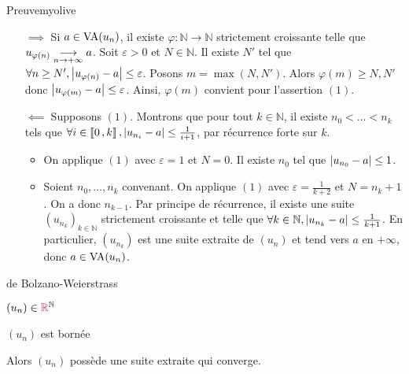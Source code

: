     \begin{demo}{Preuve}{myolive}
        \begin{itemize}
            \item[\textcolor{myolive}{$\implies$}] Si $a \in \operatorname{VA}(u_n)$, il existe $\varphi : \mathbb{N} \rightarrow \mathbb{N}$ strictement croissante telle que $u_{\varphi(n)} \underset{n \rightarrow +\infty}{\longrightarrow} a$. Soit $\varepsilon > 0$ et $N \in \mathbb{N}$. Il existe $N'$ tel que $\forall n \geq N', \left\lvert u_{\varphi(n)} - a\right\rvert \leq \varepsilon$. Posons $m = \max(N,N')$. Alors $\varphi(m) \geq N, N'$ donc $\left\lvert u_{\varphi(m)}-a\right\rvert \leq \varepsilon$. Ainsi, $\varphi(m)$ convient pour l’assertion $(1)$.
            \item[\textcolor{myolive}{$\impliedby$}] Supposons $(1)$. Montrons que pour tout $k \in \mathbb{N}$, il existe $n_0 < \ldots < n_k$ tels que $\forall i \in \left\llbracket 0 \, , k \right\rrbracket, \left\lvert u_{n_i} - a\right\rvert \leq \frac{1}{i + 1}$, par récurrence forte sur $k$.
            \begin{itemize}
                \item On applique $(1)$ avec $\varepsilon = 1$ et $N = 0$. Il existe $n_0$ tel que $\left\lvert u_{n_0} - a\right\rvert \leq 1$.
                \item Soient $n_0, \ldots, n_k$ convenant. On applique $(1)$ avec $\varepsilon = \frac{1}{k+2}$ et $N = n_k + 1$. On a donc $n_{k-1}$. Par principe de récurrence, il existe une suite $(u_{n_k})_{k \in \mathbb{N}}$ strictement croissante et telle que $\forall k \in \mathbb{N}, \left\lvert u_{n_k} - a\right\rvert \leq \frac{1}{k+1}$. En particulier, $(u_{n_k})$ est une suite extraite de $(u_n)$ et tend vers $a$ en $+\infty$, donc $a \in \operatorname{VA}(u_n)$.
            \end{itemize}
        \end{itemize}
    \end{demo}

    \begin{theo}{de Bolzano-Weierstrass}{}
        \begin{soient}
            \item $(u_n) \in \textcolor{myred}{\mathbb{R}}^{\mathbb{N}}$
            \item $(u_n)$ est bornée
        \end{soient}
        Alors $(u_n)$ possède une suite extraite qui converge.
    \end{theo}

